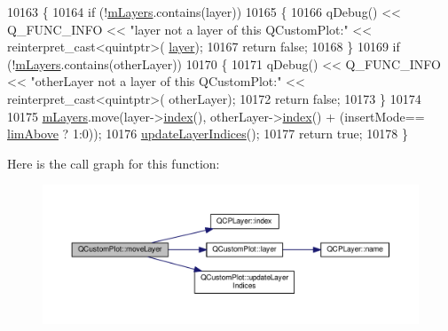 \begin{DoxyCode}
10163 \{
10164   \textcolor{keywordflow}{if} (!\hyperlink{class_q_custom_plot_a72ee313041b873d76c198793ce7e6c37}{mLayers}.contains(layer))
10165   \{
10166     qDebug() << Q\_FUNC\_INFO << \textcolor{stringliteral}{"layer not a layer of this QCustomPlot:"} << \textcolor{keyword}{reinterpret\_cast<}quintptr\textcolor{keyword}{>}(
      \hyperlink{class_q_custom_plot_aac492da01782820454e9136a8db28182}{layer});
10167     \textcolor{keywordflow}{return} \textcolor{keyword}{false};
10168   \}
10169   \textcolor{keywordflow}{if} (!\hyperlink{class_q_custom_plot_a72ee313041b873d76c198793ce7e6c37}{mLayers}.contains(otherLayer))
10170   \{
10171     qDebug() << Q\_FUNC\_INFO << \textcolor{stringliteral}{"otherLayer not a layer of this QCustomPlot:"} << \textcolor{keyword}{reinterpret\_cast<}quintptr\textcolor{keyword}{>}(
      otherLayer);
10172     \textcolor{keywordflow}{return} \textcolor{keyword}{false};
10173   \}
10174   
10175   \hyperlink{class_q_custom_plot_a72ee313041b873d76c198793ce7e6c37}{mLayers}.move(layer->\hyperlink{class_q_c_p_layer_ad5d7010829a6b99f326b07d7e37c8c99}{index}(), otherLayer->\hyperlink{class_q_c_p_layer_ad5d7010829a6b99f326b07d7e37c8c99}{index}() + (insertMode==
      \hyperlink{class_q_custom_plot_a75a8afbe6ef333b1f3d47abb25b9add7a062b0b7825650b432a713c0df6742d41}{limAbove} ? 1:0));
10176   \hyperlink{class_q_custom_plot_a3117754df3a5638787a6223c7147970f}{updateLayerIndices}();
10177   \textcolor{keywordflow}{return} \textcolor{keyword}{true};
10178 \}
\end{DoxyCode}


Here is the call graph for this function\+:\nopagebreak
\begin{figure}[H]
\begin{center}
\leavevmode
\includegraphics[width=350pt]{class_q_custom_plot_ae896140beff19424e9e9e02d6e331104_cgraph}
\end{center}
\end{figure}


\hypertarget{class_q_custom_plot_a9b6b1a0fea8da3fda6d5e3d687202877}{}
